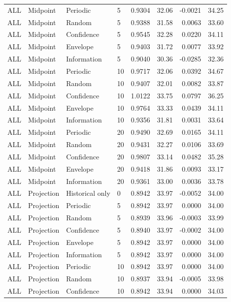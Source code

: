 \begin{longtable}{llllrrrr}
ALL & Midpoint & Periodic & 5 & 0.9304 & 32.06 & -0.0021 & 34.25 \\
ALL & Midpoint & Random & 5 & 0.9388 & 31.58 & 0.0063 & 33.60 \\
ALL & Midpoint & Confidence & 5 & 0.9545 & 32.28 & 0.0220 & 34.11 \\
ALL & Midpoint & Envelope & 5 & 0.9403 & 31.72 & 0.0077 & 33.92 \\
ALL & Midpoint & Information & 5 & 0.9040 & 30.36 & -0.0285 & 32.36 \\
ALL & Midpoint & Periodic & 10 & 0.9717 & 32.06 & 0.0392 & 34.67 \\
ALL & Midpoint & Random & 10 & 0.9407 & 32.01 & 0.0082 & 33.87 \\
ALL & Midpoint & Confidence & 10 & 1.0122 & 33.75 & 0.0797 & 36.25 \\
ALL & Midpoint & Envelope & 10 & 0.9764 & 33.33 & 0.0439 & 34.11 \\
ALL & Midpoint & Information & 10 & 0.9356 & 31.81 & 0.0031 & 33.64 \\
ALL & Midpoint & Periodic & 20 & 0.9490 & 32.69 & 0.0165 & 34.11 \\
ALL & Midpoint & Random & 20 & 0.9431 & 32.27 & 0.0106 & 33.69 \\
ALL & Midpoint & Confidence & 20 & 0.9807 & 33.14 & 0.0482 & 35.28 \\
ALL & Midpoint & Envelope & 20 & 0.9418 & 31.86 & 0.0093 & 33.17 \\
ALL & Midpoint & Information & 20 & 0.9361 & 33.00 & 0.0036 & 33.78 \\
ALL & Projection & Historical only & 0 & 0.8942 & 33.97 & -0.0052 & 34.00 \\
ALL & Projection & Periodic & 5 & 0.8942 & 33.97 & 0.0000 & 34.00 \\
ALL & Projection & Random & 5 & 0.8939 & 33.96 & -0.0003 & 33.99 \\
ALL & Projection & Confidence & 5 & 0.8940 & 33.97 & -0.0002 & 34.00 \\
ALL & Projection & Envelope & 5 & 0.8942 & 33.97 & 0.0000 & 34.00 \\
ALL & Projection & Information & 5 & 0.8942 & 33.97 & 0.0000 & 34.00 \\
ALL & Projection & Periodic & 10 & 0.8942 & 33.97 & 0.0000 & 34.00 \\
ALL & Projection & Random & 10 & 0.8937 & 33.94 & -0.0005 & 33.98 \\
ALL & Projection & Confidence & 10 & 0.8942 & 33.94 & 0.0000 & 34.03 \\

\end{longtable}
